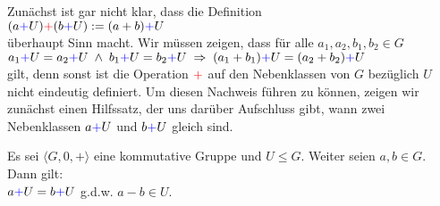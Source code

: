 \remark
Zun\"{a}chst ist gar nicht klar, dass die Definition
\\[0.2cm]
\hspace*{1.3cm}
  $(a {\color{blue}{+}} U) {\color{red}{+}} (b {\color{blue}{+}} U) := (a + b) {\color{blue}{+}} U$
\\[0.2cm]
\"{u}berhaupt Sinn macht.  Wir m\"{u}ssen zeigen, dass f\"{u}r alle $a_1,a_2, b_1, b_2 \in G$
\\[0.2cm]
\hspace*{1.3cm}
$a_1 {\color{blue}{+}} U = a_2 {\color{blue}{+}} U \;\wedge\; b_1 {\color{blue}{+}} U = b_2 {\color{blue}{+}} U \;\Rightarrow\; (a_1 + b_1) {\color{blue}{+}} U = (a_2 + b_2) {\color{blue}{+}} U$
\\[0.2cm]
gilt, denn sonst ist die Operation ${\color{red}{+}}$ auf den Nebenklassen von $G$ bez\"{u}glich $U$ nicht eindeutig
definiert.  Um diesen Nachweis f\"{u}hren zu k\"{o}nnen, zeigen wir zun\"{a}chst einen Hilfssatz, der uns dar\"{u}ber
Aufschluss gibt, wann zwei Nebenklassen $a {\color{blue}{+}} U$ und $b {\color{blue}{+}} U$ gleich sind.
\eox

\begin{Lemma}
  Es sei $\langle G, 0, + \rangle$ eine kommutative Gruppe und $U \leq G$.
  Weiter seien $a,b \in G$.  Dann gilt:
  \\[0.2cm]
  \hspace*{1.3cm}
  $a {\color{blue}{+}} U = b {\color{blue}{+}} U$ \quad g.d.w. \quad $a - b \in U$.
\end{Lemma}


